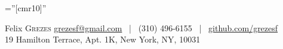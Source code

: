\documentclass[a4paper,10pt]{article}
\begin{document}

\pagestyle{empty} %

\font\fb=''[cmr10]'' %

\par{
    {\Huge Felix \textsc{Grezes}}
    \hspace*{\fill} {\large \href{mailto:grezesf@gmail.com}{grezesf@gmail.com} ~|~ {\large (310) 496-6155} ~|~ \href{https://github.com/grezesf}{github.com/grezesf} }\\
    \hspace*{\fill} {\large 19 Hamilton Terrace, Apt. 1K, New York, NY, 10031}
    \bigskip
    \par}




\end{document}
